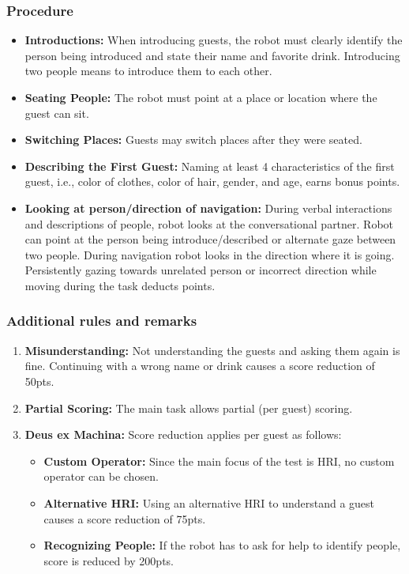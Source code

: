 \subsubsection*{Procedure}
\begin{itemize}
    \item \textbf{Introductions:} When introducing guests, the robot must clearly identify the person being introduced and state their name and favorite drink. Introducing two people means to introduce them to each other.
	
	\item \textbf{Seating People:} The robot must point at a place or location where the guest can sit.
	
	\item \textbf{Switching Places:} Guests may switch places after they were seated.
	
	\item \textbf{Describing the First Guest:} Naming at least 4 characteristics of the first guest, i.e., color of clothes, color of hair, gender, and age, earns bonus points.
	\item \textbf{Looking at person/direction of navigation:} During verbal interactions and descriptions of people, robot 
	looks at the conversational partner. Robot can point at the person being introduce/described or alternate gaze between two people. During navigation robot looks in the direction where it is going. Persistently gazing towards unrelated 
	person or incorrect direction while moving during the task deducts points. 
\end{itemize}

\subsubsection*{Additional rules and remarks}
\begin{enumerate}[nosep]
	\item \textbf{Misunderstanding:} Not understanding the guests and asking them again is fine. Continuing with a wrong name or drink causes a score reduction of 50pts.
		
	\item \textbf{Partial Scoring:} The main task allows partial (per guest) scoring.
	
	\item \textbf{Deus ex Machina:} Score reduction applies per guest as follows:
	\begin{itemize}[nosep]
		\item \textbf{Custom Operator:} Since the main focus of the test is HRI, no custom operator can be chosen.
		\item \textbf{Alternative HRI:} Using an alternative HRI to understand a guest causes a score reduction of 75pts.
		\item \textbf{Recognizing People:} If the robot has to ask for help to identify people, score is reduced by 200pts. 
	\end{itemize}
\end{enumerate}


